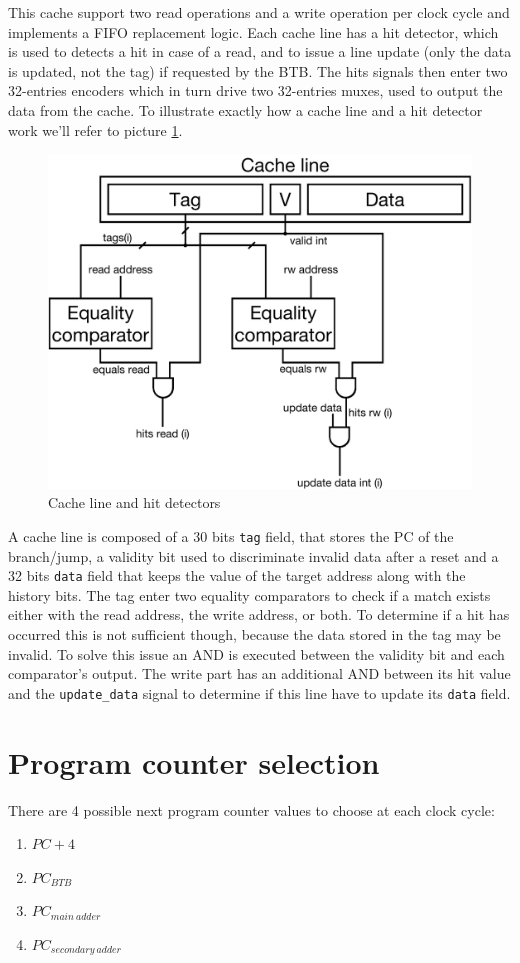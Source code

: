 This cache support two read operations and a write operation per clock cycle and implements a FIFO replacement logic. Each cache line has a hit detector, which is used to detects a hit in case of a read, and
to issue a line update (only the data is updated, not the tag) if requested by the BTB. The hits signals then enter two 32-entries encoders which in turn drive two 32-entries muxes, used to output the data from the cache.
To illustrate exactly how a cache line and a hit detector work we'll refer to picture \ref{fig:BTB_cache_line}.

\begin{figure}[!ht]
	\centering
	\includegraphics[width=0.6\linewidth]{./chapters/figures/BTB_cache_line.pdf}
    \caption{Cache line and hit detectors}
    \label{fig:BTB_cache_line}
\end{figure}

A cache line is composed of a 30 bits \verb|tag| field, that stores the PC of the branch/jump, a validity bit used to discriminate invalid data after a reset and a 32 bits \verb|data| field that keeps the value
of the target address along with the history bits. The tag enter two equality comparators to check if a match exists either with the read address, the write address, or both. To determine if a hit has occurred this
is not sufficient though, because the data stored in the tag may be invalid. To solve this issue an AND is executed between the validity bit and each comparator's output. The write part has an additional AND between
its hit value and the \verb|update_data| signal to determine if this line have to update its \verb|data| field.

\section{Program counter selection}

There are 4 possible next program counter values to choose at each clock cycle:
\begin{enumerate}
    \item $PC + 4$
    \item $PC_{BTB}$
    \item $PC_{main\ adder}$
    \item $PC_{secondary\ adder}$
\end{enumerate}

